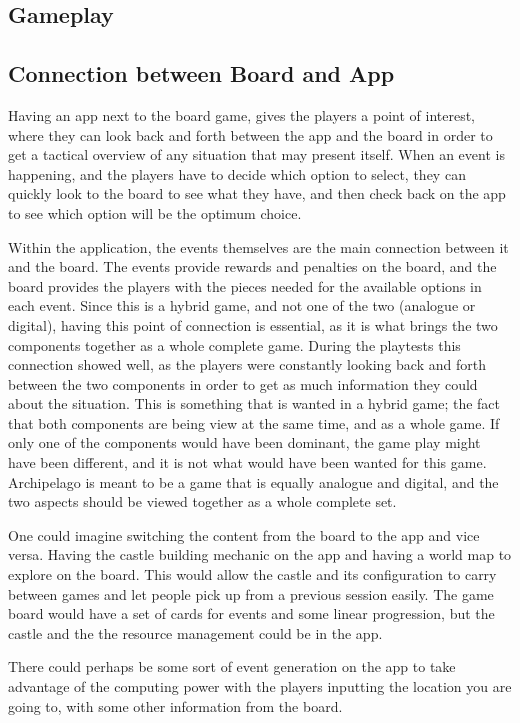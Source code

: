 \subsection{Gameplay}
\subsection{Connection between Board and App}
Having an app next to the board game, gives the players a point of interest, where they can look back and forth between the app and the board in order to get a tactical overview of any situation that may present itself. When an event is happening, and the players have to decide which option to select, they can quickly look to the board to see what they have, and then check back on the app to see which option will be the optimum choice.

Within the application, the events themselves are the main connection between it and the board. The events provide rewards and penalties on the board, and the board provides the players with the pieces needed for the available options in each event. 
Since this is a hybrid game, and not one of the two (analogue or digital), having this point of connection is essential, as it is what brings the two components together as a whole complete game. During the playtests this connection showed well, as the players were constantly looking back and forth between the two components in order to get as much information they could about the situation. This is something that is wanted in a hybrid game; the fact that both components are being view at the same time, and as a whole game. If only one of the components would have been dominant, the game play might have been different, and it is not what would have been wanted for this game. Archipelago is meant to be a game that is equally analogue and digital, and the two aspects should be viewed together as a whole complete set.


One could imagine switching the content from the board to the app and vice versa. Having the castle building mechanic on the app and having a world map to explore on the board.
This would allow the castle and its configuration to carry between games and let people pick up from a previous session easily. 
The game board would have a set of cards for events and some linear progression, but the castle and the the resource management could be in the app. 

There could perhaps be some sort of event generation on the app to take advantage of the computing power with the players inputting the location you are going to, with some other information from the board. 

